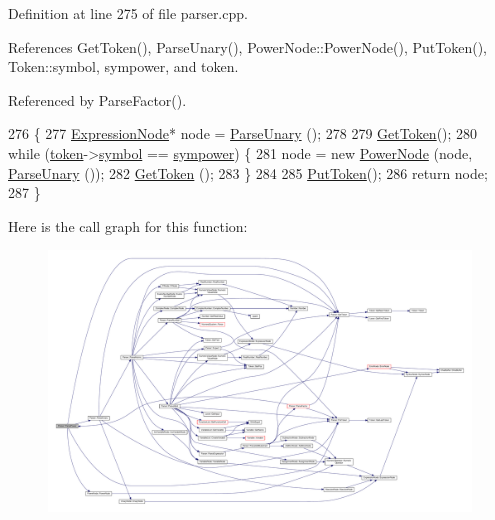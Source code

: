 Definition at line 275 of file parser.\+cpp.



References Get\+Token(), Parse\+Unary(), Power\+Node\+::\+Power\+Node(), Put\+Token(), Token\+::symbol, sympower, and token.



Referenced by Parse\+Factor().


\begin{DoxyCode}
276 \{
277     \hyperlink{classExpressionNode}{ExpressionNode}* node = \hyperlink{classParser_a446237993f806a92dd3e78ba8019f4f5}{ParseUnary} ();
278 
279     \hyperlink{classParser_a415a103e66558b4d366d9a1420561fe3}{GetToken}();
280     \textcolor{keywordflow}{while} (\hyperlink{classParser_a467028559d31c5b33f16ca8be56715cc}{token}->\hyperlink{structToken_aa671eaaae5632c5277e89a090d864820}{symbol} == \hyperlink{lex_8h_a7feef761cd73fac6e25b8bb80d2c4e54aebd05906bb437ef93900f895ecf6ea48}{sympower}) \{
281         node = \textcolor{keyword}{new} \hyperlink{classPowerNode}{PowerNode} (node, \hyperlink{classParser_a446237993f806a92dd3e78ba8019f4f5}{ParseUnary} ());
282         \hyperlink{classParser_a415a103e66558b4d366d9a1420561fe3}{GetToken} ();
283     \}
284 
285     \hyperlink{classParser_adb5c3a188b36f7ecb198ae30f06338b3}{PutToken}();
286     \textcolor{keywordflow}{return} node;
287 \}
\end{DoxyCode}


Here is the call graph for this function\+:
\nopagebreak
\begin{figure}[H]
\begin{center}
\leavevmode
\includegraphics[width=350pt]{d0/d40/classParser_ad6ccc6e873d1fb3dcfa142655a5b0732_cgraph}
\end{center}
\end{figure}




